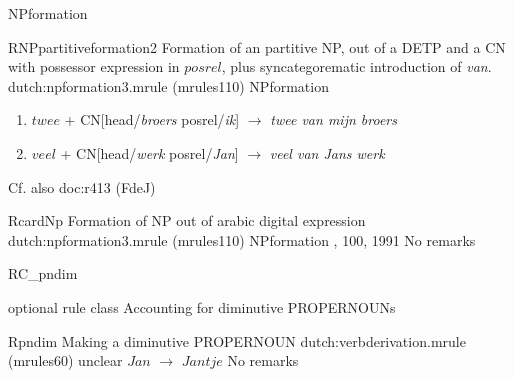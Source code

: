 \begin{mruleclass}{NPformation}
\begin{members}
\begin{member}
\end{member}
\begin{member}
 RNPpartitiveformation2
 Formation of an partitive NP, out of a DETP and a CN with 
possessor expression in 
$posrel$,
plus
syncategorematic introduction of {\em van}.
\file dutch:npformation3.mrule (mrules110)
\semantics NPformation
\example 
\begin{enumerate}
  \item 
$twee$ + CN[head/{\em broers} posrel/{\em ik}]
$\rightarrow$
{\em twee van mijn broers}
  \item
$veel$ + CN[head/{\em werk} posrel/{\em Jan}]
$\rightarrow$
{\em veel van Jans werk}
\end{enumerate}

\remarks Cf. also doc:r413 (FdeJ)
\end{member}
\begin{member}
 RcardNp
 Formation of NP out of arabic digital expression
\file dutch:npformation3.mrule (mrules110)
\semantics NPformation
, 100, 1991
\remarks No remarks
\end{member}
\end{members}
\end{mruleclass}


\begin{mruleclass}{RC\_pndim}
\begin{classdescr}
\kind optional rule class
\classtask Accounting for diminutive PROPERNOUNs
\classremarks
\nofilters
\nospeedrules
\noplannedrules
\norulesnotince
{}
\end{classdescr}
\begin{members}
\begin{member}
 Rpndim
 Making a diminutive PROPERNOUN
\file dutch:verbderivation.mrule  (mrules60)
\semantics unclear
\example $Jan$ $\rightarrow$
$Jantje $
\remarks No remarks
\end{member}
\end{members}
\end{mruleclass}


